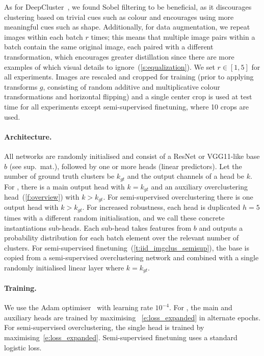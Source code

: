 As for DeepCluster~\cite{caron2018deep}, we found Sobel filtering to be beneficial, as it discourages clustering based on trivial cues such as colour and encourages using more meaningful cues such as shape.
Additionally, for data augmentation, we repeat images within each batch $r$ times; this means that multiple image pairs within a batch contain the same original image, each paired with a different transformation, which encourages greater distillation since there are more examples of which visual details to ignore~(\cref{s:equalization}).
We set $r\in[1,5]$ for all experiments. Images are rescaled and cropped for training (prior to applying transforms $g$, consisting of random additive and multiplicative colour transformations and horizontal flipping) and a single center crop is used at test time for all experiments except semi-supervised finetuning, where 10 crops are used.

\paragraph{Architecture.}
All networks are randomly initialised and consist of a ResNet or VGG11-like base $b$ (see sup.\ mat.), followed by one or more heads (linear predictors).
Let the number of ground truth clusters be $k_{gt}$ and the output channels of a head be $k$.
For \methodnameshort, there is a main output head with $k=k_{gt}$ and an auxiliary overclustering head~(\cref{f:overview}) with $k>k_{gt}$.
For semi-supervised overclustering there is one output head with $k>k_{gt}$.
For increased robustness, each head is duplicated $h=5$ times with a different random initialisation, and we call these concrete instantiations sub-heads.
Each sub-head takes features from $b$ and outputs a probability distribution for each batch element over the relevant number of clusters.
For semi-supervised finetuning~(\cref{t:iid_imgclus_semisup}), the base is copied from a semi-supervised overclustering network and combined with a single randomly initialised linear layer where $k=k_{gt}$.

\paragraph{Training.}
We use the Adam optimiser~\cite{kingma2014adam} with learning rate $10^{-4}$. For \methodnameshort, the main and auxiliary heads are trained by maximising ~\cref{e:loss_expanded} in alternate epochs.
For semi-supervised overclustering, the single head is trained by maximising~\cref{e:loss_expanded}. Semi-supervised finetuning uses a standard logistic loss.

